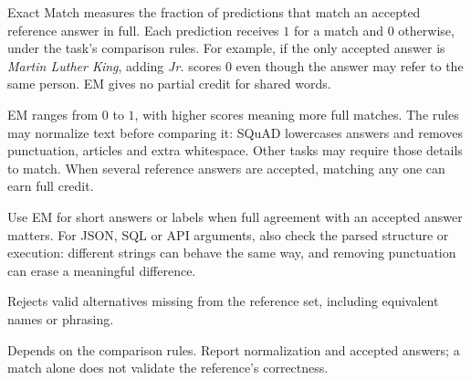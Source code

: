 Exact Match measures the fraction of predictions that match an accepted reference answer in full.
Each prediction receives $1$ for a match and $0$ otherwise, under the task's comparison rules.
For example, if the only accepted answer is \textit{Martin Luther King}, adding \textit{Jr.} scores
$0$ even though the answer may refer to the same person. EM gives no partial credit for shared words.

\begin{metricformula}
\end{metricformula}

EM ranges from $0$ to $1$, with higher scores meaning more full matches. The rules may normalize text
before comparing it: SQuAD lowercases answers and removes punctuation, articles and extra whitespace.
Other tasks may require those details to match. When several reference answers are accepted, matching
any one can earn full credit.


Use EM for short answers or labels when full agreement with an accepted answer matters. For JSON,
SQL or API arguments, also check the parsed structure or execution: different strings can behave the
same way, and removing punctuation can erase a meaningful difference.


{
\item Rejects valid alternatives missing from the reference set, including equivalent names or phrasing.
\item Depends on the comparison rules. Report normalization and accepted answers; a match alone does not
validate the reference's correctness.
}

